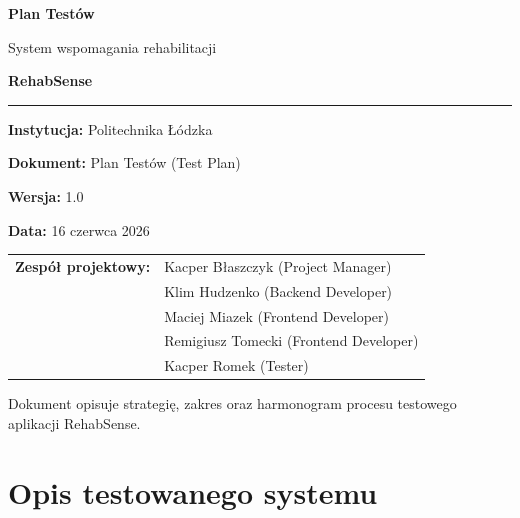 \documentclass[11pt,a4paper]{article}
\begin{document}
\begin{titlepage}
\centering
\vspace*{2cm}

{\Huge\bfseries\color{primary} Plan Testów\par}
\vspace{0.5cm}
{\LARGE System wspomagania rehabilitacji\par}
\vspace{0.3cm}
{\Huge\bfseries RehabSense\par}

\vspace{1.5cm}
\rule{0.7\textwidth}{1.2pt}\par
\vspace{1.5cm}

{\large\textbf{Instytucja:} Politechnika Łódzka\par}
\vspace{0.4cm}
{\large\textbf{Dokument:} Plan Testów (Test Plan)\par}
\vspace{0.4cm}
{\large\textbf{Wersja:} 1.0\par}
\vspace{0.4cm}
{\large\textbf{Data:} 16 czerwca 2026\par}

\vspace{2cm}

\begin{tabular}{ll}
\textbf{Zespół projektowy:} & Kacper Błaszczyk (Project Manager) \\
 & Klim Hudzenko (Backend Developer) \\
 & Maciej Miazek (Frontend Developer) \\
 & Remigiusz Tomecki (Frontend Developer) \\
 & Kacper Romek (Tester) \\
\end{tabular}

\vfill
{\small Dokument opisuje strategię, zakres oraz harmonogram procesu testowego\\ aplikacji RehabSense.}
\end{titlepage}

\tableofcontents
\newpage

\section{Opis testowanego systemu}
\end{document}
